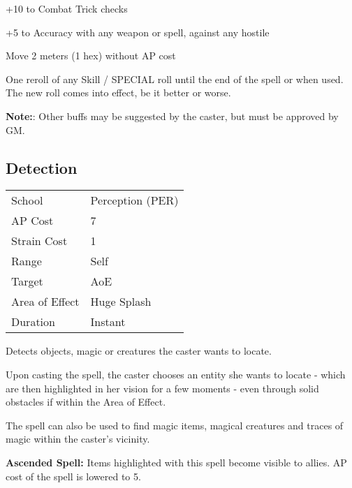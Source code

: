 \documentclass[11pt,a4paper,twocolumn]{book}
\begin{document}
\medskip
\begin{compactitem}
	\item +10 to Combat Trick checks
	\item +5 to Accuracy with any weapon or spell, against any hostile	
	\item Move 2 meters (1 hex) without AP cost
	\item One reroll of any Skill / SPECIAL roll until the end of the spell or when used. The new roll comes into effect, be it better or worse.
\end{compactitem}
\medskip

\textbf{Note:}: Other buffs may be suggested by the caster, but must be approved by GM.

\bigskip

\subsection*{Detection}
{
	\begin{tabu} to 75mm{| X[l,4] | X[l,7] |}
		\hline
		School 			& Perception (PER) 		\\
		AP Cost	      	& 7 					\\
		Strain Cost     & 1 					\\
		Range     		& Self					\\
		Target      	& AoE 					\\
		Area of Effect  & Huge Splash 	 		\\
		Duration     	& Instant 				\\ \hline
	\end{tabu}
	
}

\medskip

Detects objects, magic or creatures the caster wants to locate.

Upon casting the spell, the caster chooses an entity she wants to locate - which are then highlighted in her vision for a few moments - even through solid obstacles if within the Area of Effect.

The spell can also be used to find magic items, magical creatures and traces of magic within the caster's vicinity.

\bigskip

\textbf{Ascended Spell:} Items highlighted with this spell become visible to allies. AP cost of the spell is lowered to 5.

\end{document}
